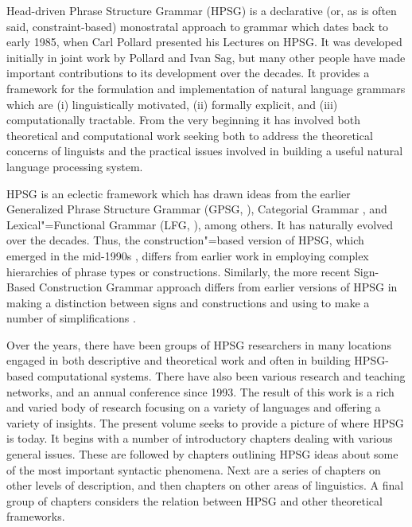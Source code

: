\begin{refsection}

Head-driven Phrase Structure Grammar (HPSG) is a declarative (or, as is often said,
constraint-based) monostratal approach to grammar which dates back to early 1985, when Carl Pollard
presented his Lectures on HPSG. It was developed initially in joint work by Pollard and Ivan Sag,
but many other people have made important contributions to its development over the decades. It
provides a framework for the formulation and implementation of natural language grammars which are
(i) linguistically motivated, (ii) formally explicit, and (iii) computationally tractable. From the
very beginning it has involved both theoretical and computational work seeking both to address the
theoretical concerns of linguists and the practical issues involved in building a useful natural
language processing system.

HPSG is an eclectic framework which has drawn ideas from the earlier Generalized Phrase Structure
Grammar (GPSG, \citealp{GKPS85a}), Categorial Grammar \citep{Ajdukiewicz35a-u}, and Lexical"=Functional
Grammar (LFG, \citealp{Bresnan82a-ed}), among others. It has naturally evolved over the decades. Thus, the construction"=based version of
HPSG, which emerged in the mid-1990s \citep{Sag97a,GSag2000a-u}, differs from earlier work
\citep{ps,ps2} in employing complex hierarchies of phrase types or
constructions. Similarly, the more recent Sign-Based Construction Grammar approach differs from
earlier versions of HPSG in making a distinction between signs and constructions and using to make a
number of simplifications \citep{Sag2012a}.

Over the years, there have been groups of HPSG researchers in many locations engaged in both
descriptive and theoretical work and often in building HPSG-based computational systems. There have
also been various research and teaching networks, and an annual conference since 1993. The result of
this work is a rich and varied body of research focusing on a variety of languages and offering a
variety of insights. The present volume seeks to provide a picture of where HPSG is today. It begins
with a number of introductory chapters dealing with various general issues. These are followed by
chapters outlining HPSG ideas about some of the most important syntactic phenomena. Next are a
series of chapters on other levels of description, and then chapters on other areas of
linguistics. A final group of chapters considers the relation between HPSG and other theoretical
frameworks.


\end{refsection}

